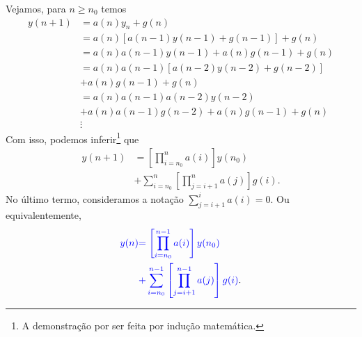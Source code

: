 Vejamos, para $n\geq n_0$ temos
\begin{align*}
  y(n+1) &= a(n)y_n + g(n) \\
         &= a(n)\left[a(n-1)y(n-1)+g(n-1)\right] + g(n) \\
         &= a(n)a(n-1)y(n-1)+a(n)g(n-1) + g(n) \\
         &= a(n)a(n-1)\left[a(n-2)y(n-2)+g(n-2)\right] \\
         &+ a(n)g(n-1) + g(n) \\
         &= a(n)a(n-1)a(n-2)y(n-2) \\
         &+ a(n)a(n-1)g(n-2) + a(n)g(n-1) + g(n) \\
         &\vdots
\end{align*}
Com isso, podemos inferir\footnote{A demonstração por ser feita por indução matemática.} que
\begin{align}
  y(n+1) &= \left[\prod_{i=n_0}^{n} a(i)\right]y(n_0) \\
         &+ \sum_{i=n_0}^n\left[\prod_{j=i+1}^{n} a(j)\right]g(i).
\end{align}
No último termo, consideramos a notação $\sum_{j=i+1}^i a(i) = 0$. Ou equivalentemente,
\begin{align}
  {\color{blue}y(n)} &{\color{blue}= \left[\prod_{i=n_0}^{n-1} a(i)\right]y(n_0)} \nonumber\\
       &{\color{blue}+ \sum_{i=n_0}^{n-1}\left[\prod_{j=i+1}^{n-1} a(j)\right]g(i)}. \label{eq:ead1_linear_eqnh_sol}
\end{align}


